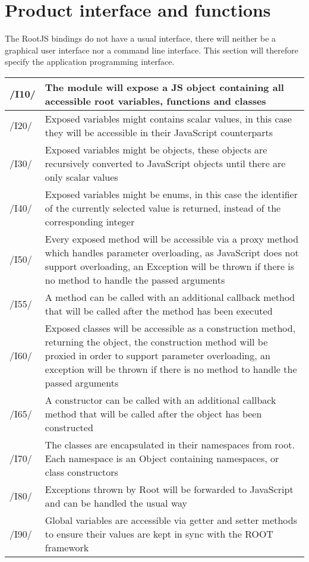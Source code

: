 \chapter{Product interface and functions}
The RootJS bindings do not have a usual interface, there will neither be a graphical user interface nor a command line interface.
This section will therefore specify the application programming interface.


\begin{longtable}{|p{1cm} | p{15cm}|}
   \hline
  /I10/ & The module will expose a JS object containing all accessible root variables, functions and classes \\
  \hline
  /I20/ & Exposed variables might contains scalar values, in this case they will be accessible in their JavaScript counterparts \\
  \hline
  /I30/ & Exposed variables might be objects, these objects are recursively converted to JavaScript objects until there are only scalar values \\
  \hline
  /I40/ & Exposed variables might be enums, in this case the identifier of the currently selected value is returned, instead of the corresponding integer \\
  \hline
  /I50/ & Every exposed method will be accessible via a proxy method which handles parameter overloading, as JavaScript does not support overloading, an Exception will be thrown if there is no method to handle the passed arguments \\
  \hline
  /I55/ & A method can be called with an additional callback method that will be called after the method has been executed \\
  \hline
  /I60/ & Exposed classes will be accessible as a construction method, returning the object, the construction method will be proxied in order to support parameter overloading, an exception will be thrown if there is no method to handle the passed arguments \\
  \hline
  /I65/ & A constructor can be called with an additional callback method that will be called after the object has been constructed \\
  \hline
  /I70/ & The classes are encapsulated in their namespaces from root. Each namespace is an Object containing namespaces, or class constructors \\
  \hline
  /I80/ & Exceptions thrown by Root will be forwarded to JavaScript and can be handled the usual way \\
  \hline
  /I90/ & Global variables are accessible via getter and setter methods to ensure their values are kept in sync with the ROOT framework \\
   \hline
\end{longtable}
